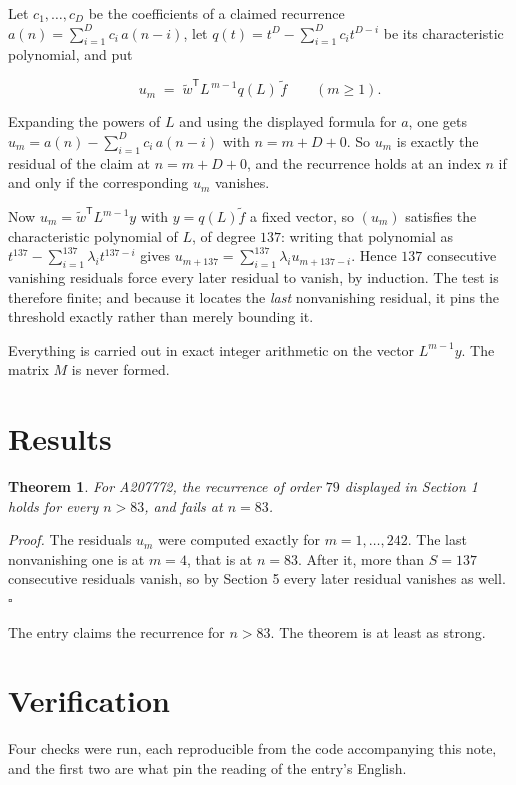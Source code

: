 \documentclass[11pt]{article}
\newtheorem{theorem}{Theorem}
\theoremstyle{definition}
\begin{document}
Let $c_1,\dots,c_D$ be the coefficients of a claimed recurrence $a(n) = \sum_{i=1}^{D} c_i\,a(n-i)$, let $q(t) = t^{D} - \sum_{i=1}^{D} c_i t^{D-i}$ be its characteristic polynomial, and put

\[u_m \;=\; \tilde w^{\mathsf T} L^{\,m-1} q(L)\,\tilde f \qquad (m \ge 1).\]

Expanding the powers of $L$ and using the displayed formula for $a$, one gets $u_m = a(n) - \sum_{i=1}^{D} c_i\,a(n-i)$ with $n = m + D + 0$. So $u_m$ is exactly the residual of the claim at $n = m + D + 0$, and the recurrence holds at an index $n$ if and only if the corresponding $u_m$ vanishes.

Now $u_m = \tilde w^{\mathsf T} L^{m-1} y$ with $y = q(L)\tilde f$ a fixed vector, so $(u_m)$ satisfies the characteristic polynomial of $L$, of degree $137$: writing that polynomial as $t^{137} - \sum_{i=1}^{137} \lambda_i t^{137-i}$ gives $u_{m+137} = \sum_{i=1}^{137} \lambda_i u_{m+137-i}$. Hence $137$ consecutive vanishing residuals force every later residual to vanish, by induction. The test is therefore finite; and because it locates the {\itshape last} nonvanishing residual, it pins the threshold exactly rather than merely bounding it.

Everything is carried out in exact integer arithmetic on the vector $L^{m-1}y$. The matrix $M$ is never formed.

\section{Results}

\begin{theorem} For A207772, the recurrence of order $79$ displayed in Section 1 holds for every $n > 83$, and fails at $n = 83$.\end{theorem}

{\itshape Proof.} The residuals $u_m$ were computed exactly for $m = 1,\dots,242$. The last nonvanishing one is at $m = 4$, that is at $n = 83$. After it, more than $S = 137$ consecutive residuals vanish, so by Section 5 every later residual vanishes as well. $\square$

The entry claims the recurrence for $n > 83$. The theorem is at least as strong.

\section{Verification}

Four checks were run, each reproducible from the code accompanying this note, and the first two are what pin the reading of the entry's English.
\end{document}
